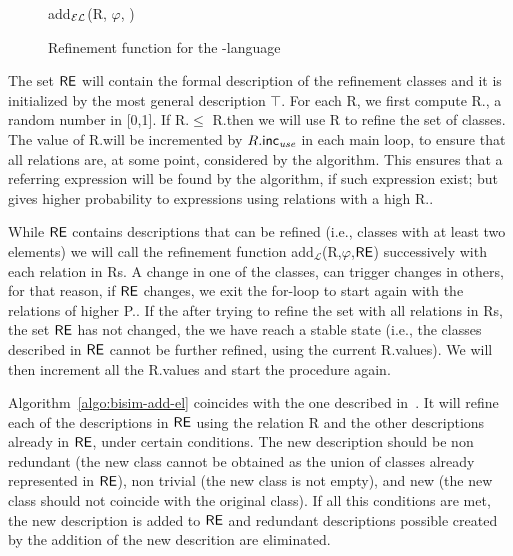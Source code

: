 \begin{figure}[t]
\small
\centering
\begin{algorithm}[H]
\dontprintsemicolon
\caption{add$_\mathcal{EL}$(R, $\varphi$, \RE)} \label{algo:bisim-add-el}

\end{algorithm}
\vspace*{-.5cm}\caption{Refinement function for the \el-language}\label{fig:algo2}
\end{figure}

The set $\textsf{RE}$ will contain the formal description of the refinement classes and it is initialized by the most general description $\top$.  
For each R, we first compute R.\randomuse, a random number in [0,1].  If R.\randomuse $\le$ R.\puse then we will use R to refine the set of classes.  The value of R.\puse will be incremented by $R.\textsf{inc}_\emph{use}$ in each main loop, to ensure that all relations are, at some point, considered by the algorithm.  This ensures that a referring expression will be found by the algorithm, if such expression exist; but gives higher probability to expressions using relations with a high R.\puse. 
 
While $\textsf{RE}$ contains descriptions that can be refined (i.e., classes with at least two elements) we will call the refinement function add$_\mathcal{L}$(R,$\varphi$,$\textsf{RE}$) successively with each relation in Rs. A change in one of the classes, can trigger changes in others, for that reason, if $\textsf{RE}$ changes, we exit the for-loop to start again with the relations of higher P.\puse. If the after trying to refine the set with all relations in Rs, the set $\textsf{RE}$ has not changed, the we have reach a stable state (i.e., the classes described in $\textsf{RE}$ cannot be further refined, using the current R.\puse values). We will then increment all the R.\puse values and start the procedure again. 

Algorithm~\ref{algo:bisim-add-el} coincides with the one described in~\cite{arec2:2008:Areces}.  It will refine each of the descriptions in $\textsf{RE}$ using the relation R and the other descriptions already in $\textsf{RE}$, under certain conditions. The new description should be non redundant (the new  class cannot be obtained as the union of classes already represented in $\textsf{RE}$), non trivial (the new class is not empty), and 
new (the new class should not coincide with the original class).  If all this conditions are met, the new description is added to $\textsf{RE}$ and redundant descriptions possible created by the addition of the new descrition are eliminated.   
